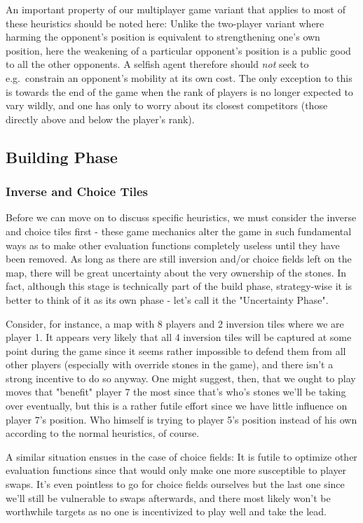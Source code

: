 An important property of our multiplayer game variant that applies to most of these heuristics should be noted here: Unlike the two-player variant where harming the opponent's position is equivalent to strengthening one's own position, here the weakening of a particular opponent's position is a public good to all the other opponents. A selfish agent therefore should \emph{not} seek to e.g.\ constrain an opponent's mobility at its own cost. The only exception to this is towards the end of the game when the rank of players is no longer expected to vary wildly, and one has only to worry about its closest competitors (those directly above and below the player's rank).

\subsection{Building Phase}

\subsubsection{Inverse and Choice Tiles}
Before we can move on to discuss specific heuristics, we must consider the inverse and choice tiles first - these game mechanics alter the game in such fundamental ways as to make other evaluation functions completely useless until they have been removed. As long as there are still inversion and/or choice fields left on the map, there will be great uncertainty about the very ownership of the stones. In fact, although this stage is technically part of the build phase, strategy-wise it is better to think of it as its own phase - let's call it the "Uncertainty Phase".

Consider, for instance, a map with 8 players and 2 inversion tiles where we are player 1. It appears very likely that all 4 inversion tiles will be captured at some point during the game since it seems rather impossible to defend them from all other players (especially with override stones in the game), and there isn't a strong incentive to do so anyway. One might suggest, then, that we ought to play moves that "benefit" player 7 the most since that's who's stones we'll be taking over eventually, but this is a rather futile effort since we have little influence on player 7's position. Who himself is trying to  player 5's position instead of his own according to the normal heuristics, of course.

A similar situation ensues in the case of choice fields: It is futile to optimize other evaluation functions since that would only make one more susceptible to player swaps. It's even pointless to go for choice fields ourselves but the last one since we'll still be vulnerable to swaps afterwards, and there most likely won't be worthwhile targets as no one is incentivized to play well and take the lead.

